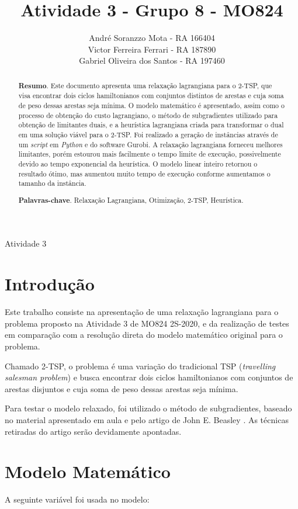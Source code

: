 \documentclass{TEMA}
\title{Atividade 3 - Grupo 8 - MO824}
\author{
    André Soranzzo Mota          - RA 166404\\
    Victor Ferreira Ferrari      - RA 187890\\
    Gabriel Oliveira dos Santos  - RA 197460
}
\begin{document}
\criartitulo

%
{Atividade 3}

\begin{abstract}
{\bf Resumo}. Este documento apresenta uma relaxação lagrangiana para o 2-TSP, que visa encontrar dois ciclos hamiltonianos com conjuntos distintos de arestas e cuja soma de peso dessas arestas seja mínima. O modelo matemático é apresentado, assim como o processo de obtenção do custo lagrangiano, o método de subgradientes utilizado para obtenção de limitantes duais, e a heurística lagrangiana criada para transformar o dual em uma solução viável para o 2-TSP. Foi realizado a geração de instâncias através de um \textit{script} em \emph{Python} e do software Gurobi. A relaxação lagrangiana forneceu melhores limitantes, porém estourou mais facilmente o tempo limite de execução, possivelmente devido ao tempo exponencial da heurística. O modelo linear inteiro retornou o resultado ótimo, mas aumentou muito tempo de execução conforme aumentamos o tamanho da instância.

{\bf Palavras-chave}. Relaxação Lagrangiana, Otimização, 2-TSP, Heurística.

\end{abstract}

\section{Introdução}

    Este trabalho consiste na apresentação de uma relaxação lagrangiana para o problema proposto na Atividade 3 de MO824 2S-2020, e da realização de testes em comparação com a resolução direta do modelo matemático original para o problema.
    
    Chamado 2-TSP, o problema é uma variação do tradicional TSP (\textit{travelling salesman problem}) e busca encontrar dois ciclos hamiltonianos com conjuntos de arestas disjuntos e cuja soma de peso dessas arestas seja mínima.
    
    Para testar o modelo relaxado, foi utilizado o método de subgradientes, baseado no material apresentado em aula e pelo artigo de John E. Beasley \cite{beasley}. As técnicas retiradas do artigo serão devidamente apontadas.

\section{Modelo Matemático}
    A seguinte variável foi usada no modelo:
    
\end{document}
